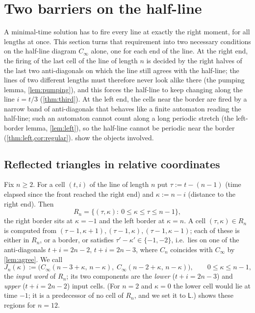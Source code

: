 \section{Two barriers on the half-line}\label{sec:pumping}

A minimal-time solution has to fire every line at exactly the right moment,
for all lengths at once. This section turns that requirement into two
necessary conditions on the half-line diagram $C_\infty$ alone, one for
each end of the line. At the right end, the firing of the last cell of the
line of length $n$ is decided by the right halves of the last two
anti-diagonals on which the line still agrees with the half-line; the lines of two
different lengths must therefore never look alike there (the pumping lemma,
\cref{lem:pumping}), and this forces the half-line to keep changing along
the line $i=t/3$ (\cref{thm:third}). At the left end, the cells near the
border are fired by a narrow band of anti-diagonals that behaves like a
finite automaton reading the half-line; such an automaton cannot count
along a long periodic stretch (the left-border lemma, \cref{lem:left}), so
the half-line cannot be periodic near the border
(\cref{thm:left,cor:regular}).  show the
objects involved.

\subsection{Reflected triangles in relative coordinates}\label{sec:coords}

Fix $n\ge2$. For a cell $(t,i)$ of the line of length $n$ put
$\tau:=t-(n-1)$ (time elapsed since the front reached the right end) and
$\kappa:=n-i$ (distance to the right end). Then
\[
R_n=\{(\tau,\kappa):\ 0\le\kappa\le\tau\le n-1\},
\]
the right border sits at $\kappa=-1$ and the left border at $\kappa=n$.
A cell $(\tau,\kappa)\in R_n$ is computed from
$(\tau-1,\kappa+1),(\tau-1,\kappa),(\tau-1,\kappa-1)$; each of these is
either in $R_n$, or a border, or satisfies $\tau'-\kappa'\in\{-1,-2\}$,
i.e.\ lies on one of the anti-diagonals $t+i=2n-2$, $t+i=2n-3$, where
$C_n$ coincides with $C_\infty$ by \cref{lem:agree}. We call
\[
J_n(\kappa):=\bigl(C_\infty(n-3+\kappa,\,n-\kappa),\;C_\infty(n-2+\kappa,\,n-\kappa)\bigr),
\qquad 0\le\kappa\le n-1,
\]
the \emph{input word} of $R_n$; its two components are the \emph{lower}
($t+i=2n-3$) and \emph{upper} ($t+i=2n-2$) input cells. (For $n=2$ and
$\kappa=0$ the lower cell would lie at time $-1$; it is a predecessor of no
cell of $R_n$, and we set it to $\mathsf L$.)  shows these
regions for $n=12$.

